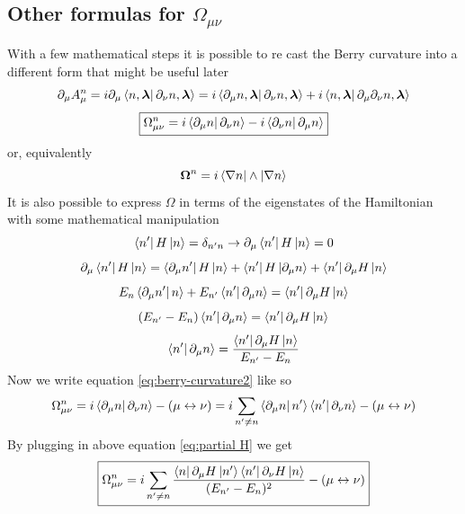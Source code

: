     \subsection*{Other formulas for $\Omega_{\mu\nu}$}

        With a few mathematical steps it is possible to re cast the Berry curvature into a different form that might be useful later
        \[
            \partial_\mu A^n_\mu =i\partial_\mu \bra{n,\boldsymbol \lambda}\partial_\nu n,\boldsymbol \lambda \rangle= 
            i\bra{\partial_\mu n,\boldsymbol \lambda}\partial_\nu n,\boldsymbol \lambda \rangle + i\bra{n,\boldsymbol \lambda}\partial_\mu\partial_\nu n,\boldsymbol \lambda \rangle
        \]
        \begin{equation}
            \label{eq:berry-curvature2}
                \boxed{\Omega_{\mu\nu}^n =i\bra{\partial_\mu n}\partial_\nu n\rangle - i\bra{\partial_\nu n}\partial_\mu n\rangle}
        \end{equation}
        or, equivalently
        \begin{equation}
            \boldsymbol \Omega^n=i\bra{\nabla n}\wedge\ket{\nabla n}
        \end{equation}
        It is also possible to express $\Omega$ in terms of the eigenstates of the Hamiltonian with some mathematical manipulation
        \[
            \bra{n'} H \ket{n}=\delta_{n'n} \to \partial_\mu \bra{n'} H \ket{n}=0
        \]
        \[
        \partial_\mu \bra{n'} H \ket{n}=\bra{\partial_\mu n'}H\ket{n} + \bra{n'}H\ket{\partial_\mu n} + \bra{n'} \partial_\mu H\ket{n}
        \]
        \[
            E_{n}\bra{\partial_\mu n'}n\rangle + E_{n'} \bra{n'}\partial_\mu n\rangle=\bra{n'} \partial_\mu H\ket{n}
        \]
        \[
            (E_{n'}-E_n)\bra{n'} \partial_\mu n\rangle=\bra{n'} \partial_\mu H\ket{n}
        \]
        \begin{equation}
            \label{eq:partial H}
                \bra{n'}\partial_\mu n\rangle=  \frac{\bra{n'} \partial_\mu H\ket{n}}{E_{n'}-E_n}
        \end{equation}
        Now we write equation \ref{eq:berry-curvature2} like so
        \[
            \Omega_{\mu\nu}^n =i\bra{\partial_\mu n}\partial_\nu n\rangle - (\mu \leftrightarrow \nu)= i\sum_{n'\neq n}\bra{\partial_\mu n}n'\rangle\bra{n'}\partial_\nu n\rangle - (\mu \leftrightarrow \nu)
        \]
        By plugging in above equation \ref{eq:partial H} we get
        \begin{equation}
            \label{eq:berry-curvature3}
            \boxed{
                \Omega_{\mu\nu}^n=i\sum_{n'\neq n} \frac{\bra{n}\partial_\mu H\ket{n'}\bra{n'} \partial_\nu H\ket{n}}{(E_{n'}-E_n)^2}- (\mu \leftrightarrow \nu)
                }
        \end{equation}
